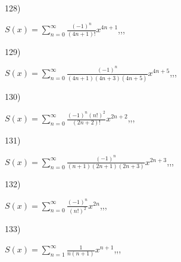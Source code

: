 \documentclass[11pt, ukrainian]{article}
\begin{document}
\par
\vspace{0.9cm}
128) \space 
{%
{$S(x)=\sum\limits_{n=0}^{\infty}{\frac{(-1)^n}{(4n+1)!}}{x^{{4n+1}}}$},,, \par \smallskip  
}
\par
\vspace{0.9cm}
129) \space 
{%
{$S(x)=\sum\limits_{n=0}^{\infty}{\frac{(-1)^n}{(4n+1)(4n+3)(4n+5)}}{x^{{4n+5}}}$},,, \par \smallskip  
}
\par
\vspace{0.9cm}
130) \space 
{%
{$S(x)=\sum\limits_{n=0}^{\infty}{\frac{{(-1)^n}{(n!)^2}}{(2n+2)!}}{x^{{2n+2}}}$},,, \par \smallskip  
}
\par
\newpage
131) \space 
{%
{$S(x)=\sum\limits_{n=0}^{\infty}{\frac{(-1)^n}{(n+1)(2n+1)(2n+3)}}{x^{{2n+3}}}$},,, \par \smallskip  
}
\par
\vspace{0.9cm}
132) \space 
{%
{$S(x)=\sum\limits_{n=0}^{\infty}{\frac{(-1)^n}{(n!)^2}}{x^{{2n}}}$},,, \par \smallskip  
}
\par
\vspace{0.9cm}
133) \space 
{%
{$S(x)=\sum\limits_{n=1}^{\infty}{\frac{1}{n(n+1)}}{x^{{n+1}}}$},,, \par \smallskip  
}
\end{document}
